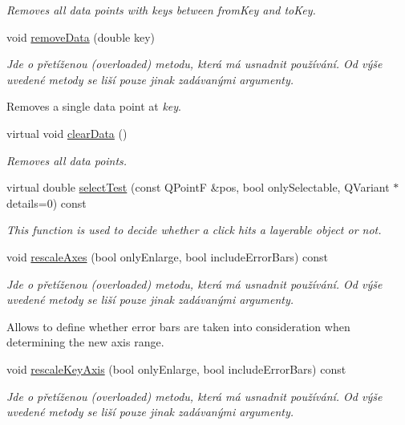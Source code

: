 \begin{DoxyCompactItemize}
\begin{DoxyCompactList}\small\item\em Removes all data points with keys between {\itshape from\+Key} and {\itshape to\+Key}. \end{DoxyCompactList}\item 
void \hyperlink{classQCPGraph_a4a706020b4318f118381648ef18aca3f}{remove\+Data} (double key)
\begin{DoxyCompactList}\small\item\em Jde o přetíženou (overloaded) metodu, která má usnadnit používání. Od výše uvedené metody se liší pouze jinak zadávanými argumenty.

Removes a single data point at {\itshape key}. \end{DoxyCompactList}\item 
virtual void \hyperlink{classQCPGraph_ad4e94a4e44e5e76fbec81a72a977157d}{clear\+Data} ()
\begin{DoxyCompactList}\small\item\em Removes all data points. \end{DoxyCompactList}\item 
virtual double \hyperlink{classQCPGraph_abc9ff375aabcf2d21cca33d6baf85772}{select\+Test} (const Q\+Point\+F \&pos, bool only\+Selectable, Q\+Variant $\ast$details=0) const 
\begin{DoxyCompactList}\small\item\em This function is used to decide whether a click hits a layerable object or not. \end{DoxyCompactList}\item 
void \hyperlink{classQCPGraph_aa35b75b9032800d783df749c8a004ee9}{rescale\+Axes} (bool only\+Enlarge, bool include\+Error\+Bars) const 
\begin{DoxyCompactList}\small\item\em Jde o přetíženou (overloaded) metodu, která má usnadnit používání. Od výše uvedené metody se liší pouze jinak zadávanými argumenty.

Allows to define whether error bars are taken into consideration when determining the new axis range. \end{DoxyCompactList}\item 
void \hyperlink{classQCPGraph_a2108a729046b0ab6e0516afb249dab13}{rescale\+Key\+Axis} (bool only\+Enlarge, bool include\+Error\+Bars) const 
\begin{DoxyCompactList}\small\item\em Jde o přetíženou (overloaded) metodu, která má usnadnit používání. Od výše uvedené metody se liší pouze jinak zadávanými argumenty.


\end{DoxyCompactList}
\end{DoxyCompactItemize}
